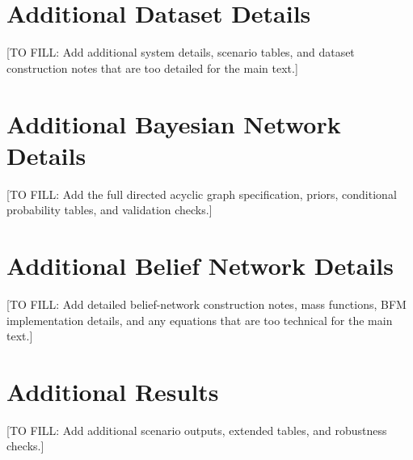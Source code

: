 \documentclass[runningheads]{llncs}
\begin{document}
\section{Additional Dataset Details}
\label{app:additional_dataset_details}

[TO FILL: Add additional system details, scenario tables, and dataset construction notes that are too detailed for the main text.]

\section{Additional Bayesian Network Details}
\label{app:additional_bn_details}

[TO FILL: Add the full directed acyclic graph specification, priors, conditional probability tables, and validation checks.]

\section{Additional Belief Network Details}
\label{app:additional_belief_network_details}

[TO FILL: Add detailed belief-network construction notes, mass functions, BFM implementation details, and any equations that are too technical for the main text.]

\section{Additional Results}
\label{app:additional_results}

[TO FILL: Add additional scenario outputs, extended tables, and robustness checks.]




\end{document}
